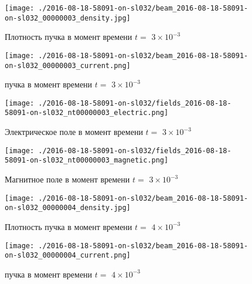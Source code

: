 \documentclass[a4paper,14pt]{extreport}
\begin{document}
\begin{center}
\begin{figure}[!hbt]
\texttt{[image: ./2016-08-18-58091-on-sl032/beam\_2016-08-18-58091-on-sl032\_00000003\_density.jpg]}
\caption{\label{density_beam3_12} Плотность пучка в момент времени $t = $ $3\times 10^{-3}$ }
\end{figure}
\end{center}
\begin{center}
\begin{figure}[!hbt]
\texttt{[image: ./2016-08-18-58091-on-sl032/beam\_2016-08-18-58091-on-sl032\_00000003\_current.png]}
\caption{\label{current_beam3_13}  пучка в момент времени $t = $ $3\times 10^{-3}$ }
\end{figure}
\end{center}
\begin{center}
\begin{figure}[!hbt]
\texttt{[image: ./2016-08-18-58091-on-sl032/fields\_2016-08-18-58091-on-sl032\_nt00000003\_electric.png]}
\caption{\label{electric_3_14} Электрическое поле  в момент времени $t = $ $3\times 10^{-3}$ }
\end{figure}
\end{center}
\begin{center}
\begin{figure}[!hbt]
\texttt{[image: ./2016-08-18-58091-on-sl032/fields\_2016-08-18-58091-on-sl032\_nt00000003\_magnetic.png]}
\caption{\label{magnetic_3_15} Магнитное поле  в момент времени $t = $ $3\times 10^{-3}$ }
\end{figure}
\end{center}
\begin{center}
\begin{figure}[!hbt]
\texttt{[image: ./2016-08-18-58091-on-sl032/beam\_2016-08-18-58091-on-sl032\_00000004\_density.jpg]}
\caption{\label{density_beam4_16} Плотность пучка в момент времени $t = $ $4\times 10^{-3}$ }
\end{figure}
\end{center}
\begin{center}
\begin{figure}[!hbt]
\texttt{[image: ./2016-08-18-58091-on-sl032/beam\_2016-08-18-58091-on-sl032\_00000004\_current.png]}
\caption{\label{current_beam4_17}  пучка в момент времени $t = $ $4\times 10^{-3}$ }
\end{figure}
\end{center}
\end{document}
